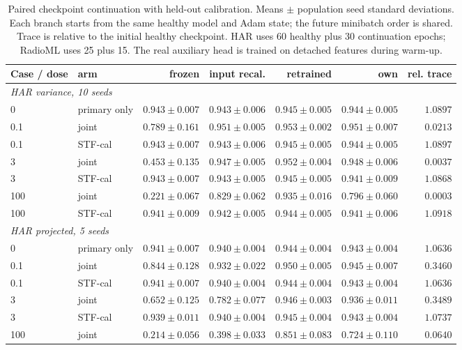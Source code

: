 \begin{table}[t]
\centering
\caption{Paired checkpoint continuation with held-out calibration. Means $\pm$ population seed standard deviations. Each branch starts from the same healthy model and Adam state; the future minibatch order is shared. Trace is relative to the initial healthy checkpoint. HAR uses 60 healthy plus 30 continuation epochs; RadioML uses 25 plus 15. The real auxiliary head is trained on detached features during warm-up.}
\label{tab:cpu_paired}
\footnotesize
\begin{tabular}{llrrrrr}
\toprule
Case / dose & arm & frozen & input recal. & retrained & own & rel. trace \\
\midrule
\multicolumn{7}{l}{\textit{HAR variance, 10 seeds}} \\
$0$ & primary only & $0.943\pm0.007$ & $0.943\pm0.006$ & $0.945\pm0.005$ & $0.944\pm0.005$ & $1.0897$ \\
0.1 & joint & $0.789\pm0.161$ & $0.951\pm0.005$ & $0.953\pm0.002$ & $0.951\pm0.007$ & $0.0213$ \\
0.1 & STF-cal & $0.943\pm0.007$ & $0.943\pm0.006$ & $0.945\pm0.005$ & $0.944\pm0.005$ & $1.0897$ \\
3 & joint & $0.453\pm0.135$ & $0.947\pm0.005$ & $0.952\pm0.004$ & $0.948\pm0.006$ & $0.0037$ \\
3 & STF-cal & $0.943\pm0.007$ & $0.943\pm0.005$ & $0.945\pm0.005$ & $0.941\pm0.009$ & $1.0868$ \\
100 & joint & $0.221\pm0.067$ & $0.829\pm0.062$ & $0.935\pm0.016$ & $0.796\pm0.060$ & $0.0003$ \\
100 & STF-cal & $0.941\pm0.009$ & $0.942\pm0.005$ & $0.944\pm0.005$ & $0.941\pm0.006$ & $1.0918$ \\
\midrule
\multicolumn{7}{l}{\textit{HAR projected, 5 seeds}} \\
$0$ & primary only & $0.941\pm0.007$ & $0.940\pm0.004$ & $0.944\pm0.004$ & $0.943\pm0.004$ & $1.0636$ \\
0.1 & joint & $0.844\pm0.128$ & $0.932\pm0.022$ & $0.950\pm0.005$ & $0.945\pm0.007$ & $0.3460$ \\
0.1 & STF-cal & $0.941\pm0.007$ & $0.940\pm0.004$ & $0.944\pm0.004$ & $0.943\pm0.004$ & $1.0636$ \\
3 & joint & $0.652\pm0.125$ & $0.782\pm0.077$ & $0.946\pm0.003$ & $0.936\pm0.011$ & $0.3489$ \\
3 & STF-cal & $0.939\pm0.011$ & $0.940\pm0.004$ & $0.945\pm0.004$ & $0.943\pm0.004$ & $1.0737$ \\
100 & joint & $0.214\pm0.056$ & $0.398\pm0.033$ & $0.851\pm0.083$ & $0.724\pm0.110$ & $0.0640$ \\

\end{tabular}
\end{table}
